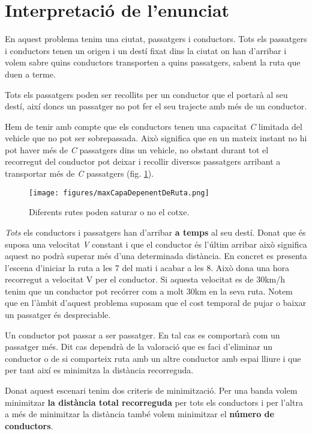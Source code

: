 \section{Interpretació de l'enunciat}

En aquest problema tenim una ciutat, passatgers i conductors. Tots els passatgers i conductors
tenen un origen i un destí fixat dins la ciutat on han d'arribar i volem sabre quins conductors
transporten a quins passatgers, sabent la ruta que duen a terme.

Tots els passatgers poden ser recollits per un conductor que el portarà al seu destí,
així doncs un passatger no pot fer el seu trajecte amb més de un conductor.

Hem de tenir amb compte que els conductors tenen una capacitat \emph{C} limitada del vehicle que no pot ser
sobrepassada. Això significa que en un mateix instant no hi pot haver més de \emph{C} passatgers dins un vehicle,
no obstant durant tot el recorregut del conductor pot deixar i recollir diversos passatgers arribant a transportar
més de \emph{C} passatgers (fig. \ref{maxCapaDepenentDeRuta}).

\begin{figure}[H]
\begin{center} 
 \texttt{[image: figures/maxCapaDepenentDeRuta.png]}
 \caption{Diferents rutes poden saturar o no el cotxe.}
  \label{maxCapaDepenentDeRuta}
\end{center}
\end{figure}


\emph{Tots} els conductors i passatgers han d'arribar \textbf{a temps} al seu destí. Donat que és
suposa una velocitat \emph{V} constant i que el conductor és l'últim arribar això significa aquest no podrà
superar més d'una determinada distància. En concret es presenta l'escena d'iniciar la ruta a les 7 del mati
i acabar a les 8. Això dona una hora recorregut a velocitat V per el conductor. Si aquesta velocitat es
de 30km/h tenim que un conductor pot recórrer com a molt 30km en la seva ruta. Notem que en l'àmbit
d'aquest problema suposam que el cost temporal de pujar o baixar un passatger és despreciable.

Un conductor pot passar a ser passatger. En tal cas es comportarà com un passatger més. Dit cas
dependrà de la valoració que es faci d'eliminar un conductor o de si comparteix ruta amb un altre
conductor amb espai lliure i que per tant així es minimitza la distància recorreguda.

Donat aquest escenari tenim dos criteris de minimització.
Per una banda volem minimitzar \textbf{la distància total recorreguda} per tots els conductors i per l'altra
a més de minimitzar la distància també volem minimitzar el \textbf{número de conductors}.

